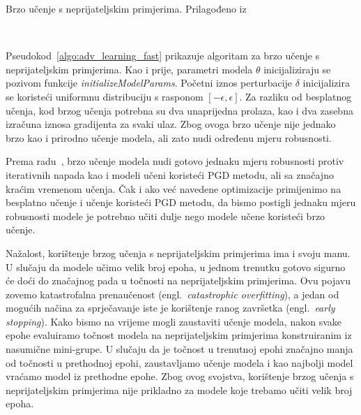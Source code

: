 \documentclass[times, utf8, zavrsni, numeric]{fer}
\begin{document}
\begin{algorithm}
    \caption{Brzo učenje s neprijateljskim primjerima. Prilagođeno iz~\cite{wong2020fast}}
    \label{algo:adv_learning_fast}
    \begin{algorithmic}
        \\\hrulefill
            \ENDFOR
        \ENDFOR
    \end{algorithmic}
\end{algorithm}

Pseudokod~\ref{algo:adv_learning_fast} prikazuje algoritam za brzo učenje s neprijateljskim primjerima.
Kao i prije, parametri modela $\theta$ inicijaliziraju se pozivom funkcije \textit{initializeModelParams}.
Početni iznos perturbacije $\delta$ inicijalizira se koristeći uniformnu distribuciju s rasponom $[-\epsilon, \epsilon]$.
Za razliku od besplatnog učenja, kod brzog učenja potrebna su dva unaprijedna prolaza, kao i dva zasebna izračuna iznosa gradijenta za svaki ulaz.
Zbog ovoga brzo učenje nije jednako brzo kao i prirodno učenje modela, ali zato nudi određenu mjeru robusnosti.

Prema radu~\cite{wong2020fast}, brzo učenje modela nudi gotovo jednaku mjeru robusnosti protiv iterativnih napada kao i modeli učeni koristeći PGD metodu, 
ali sa značajno kraćim vremenom učenja. Čak i ako već navedene optimizacije primijenimo na besplatno učenje i učenje koristeći PGD metodu, 
da bismo postigli jednaku mjeru robusnosti modele je potrebno učiti dulje nego modele učene koristeći brzo učenje.

Nažalost, korištenje brzog učenja s neprijateljskim primjerima ima i svoju manu. U slučaju da modele učimo velik broj epoha,
u jednom trenutku gotovo sigurno će doći do značajnog pada u točnosti na neprijateljskim primjerima. Ovu pojavu zovemo katastrofalna prenaučenost (engl.\ \textit{catastrophic overfitting}),
a jedan od mogućih načina za sprječavanje iste je korištenje ranog završetka (engl.\ \textit{early stopping}). 
Kako bismo na vrijeme mogli zaustaviti učenje modela, nakon svake epohe evaluiramo točnost modela na neprijateljskim primjerima konstruiranim iz nasumične mini-grupe.
U slučaju da je točnost u trenutnoj epohi značajno manja od točnosti u prethodnoj epohi, zaustavljamo učenje modela i kao najbolji model vraćamo model iz prethodne epohe.
Zbog ovog svojstva, korištenje brzog učenja s neprijateljskim primjerima nije prikladno za modele koje trebamo učiti velik broj epoha.
\end{document}
